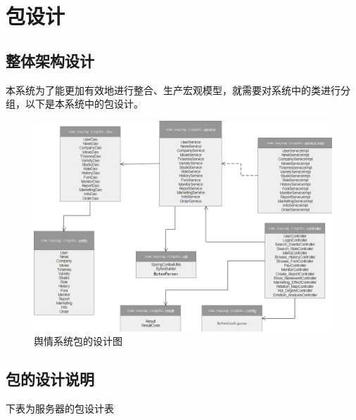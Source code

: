 \section{包设计}
\subsection{整体架构设计}
本系统为了能更加有效地进行整合、生产宏观模型，就需要对系统中的类进行分组，以下是本系统中的包设计。

\begin{figure}[!htbp]
	\centering
	\includegraphics[scale=0.75]{image/o2.png}
	\caption{舆情系统包的设计图}
\end{figure}

\newpage
\subsection{包的设计说明}
下表为服务器的包设计表

